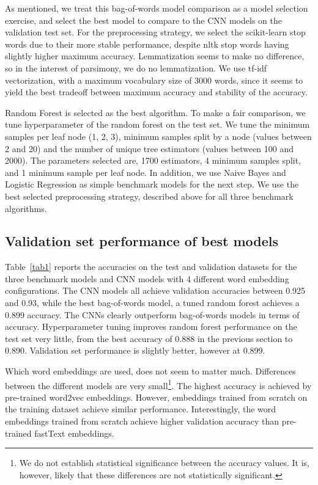 \documentclass[conference]{IEEEtran}
\begin{document}
As mentioned, we treat this  bag-of-words model comparison as a model selection exercise, and select the best model to compare to the CNN models on the validation test set. For the preprocessing strategy, we select the scikit-learn stop words due to their more stable performance, despite nltk stop words having slightly higher maximum accuracy. Lemmatization seems to make no difference, so in the interest of parsimony, we do no lemmatization. We use tf-idf vectorization, with a maximum vocabulary size of 3000 words, since it seems to yield the best tradeoff between maximum accuracy and stability of the accuracy.

Random Forest is selected as the best algorithm. To make a fair comparison, we tune hyperparameter of the random forest on the test set. We tune the minimum samples per leaf node (1, 2, 3), minimum samples split by a node (values between 2 and 20) and the number of unique tree estimators (values between 100 and 2000). The parameters selected are, 1700 estimators, 4 minimum samples split, and 1 minimum sample per leaf node. In addition, we use Naive Bayes and Logistic Regression as simple benchmark models for the next step. We use the best selected preprocessing strategy, described above for all three benchmark algorithms.

\subsection{Validation set performance of best models}

Table~\ref{tab1} reports the accuracies on the test and validation datasets for the three benchmark models and CNN models with 4 different word embedding configurations. The CNN models all achieve validation accuracies between 0.925 and 0.93, while the best bag-of-words model, a tuned random forest achieves a 0.899 accuracy. The CNNs clearly outperform bag-of-words models in terms of accuracy. Hyperparameter tuning improves random forest performance on the test set very little, from the best accuracy of 0.888 in the previous section to 0.890. Validation set performance is slightly better, however at 0.899.

Which word embeddings are used, does not seem to matter much. Differences between the different models are very small\footnote{We do not establish statistical significance between the accuracy values. It is, however, likely that these differences are not statistically significant.}. The highest accuracy is achieved by pre-trained word2vec embeddings. However, embeddings trained from scratch on the training dataset achieve similar performance. Interestingly, the word embeddings trained from scratch achieve higher validation accuracy than pre-trained fastText embeddings. 
\end{document}
